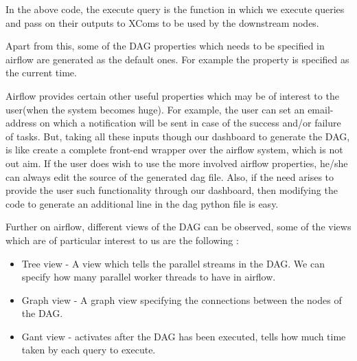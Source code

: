 \documentclass[letterpaper,10pt,english]{sphinxmanual}
\begin{document}
In the above code, the execute query is the function in which we execute queries and pass on their outputs to XComs to be used by the downstream nodes.

\begin{sphinxVerbatim}[commandchars=\\\{\}]
\PYG{p}{[}\PYG{p}{]}
\PYG{p}{[}\PYG{p}{]}\PYG{p}{[}\PYG{p}{]}  
\end{sphinxVerbatim}

Apart from this, some of the DAG properties which needs to be specified in airflow are generated as the default ones. For example the  property is specified as the current time.

Airflow provides certain other useful properties which may be of interest to the user(when the system becomes huge). For example, the user can set an email-address on which a notification will be sent in case of the success and/or failure of tasks. But, taking all these inputs though our dashboard to generate the DAG, is like create a complete front-end wrapper over the airflow system, which is not out aim. If the user does wish to use the more involved airflow properties, he/she can always edit the source of the generated dag file. Also, if the need arises to provide the user such functionality through our dashboard, then modifying the code to generate an additional line in the dag python file is easy.

Further on airflow, different views of the DAG can be observed, some of the views which are of particular interest to us are the following :
\begin{itemize}
\item {} 
Tree view - A view which tells the parallel streams in the DAG. We can specify how many parallel worker threads to have in airflow.

\item {} 
Graph view - A graph view specifying the connections between the nodes of the DAG.

\item {} 
Gant view - activates after the DAG has been executed, tells how much time taken by each query to execute.

\end{itemize}
\end{document}
